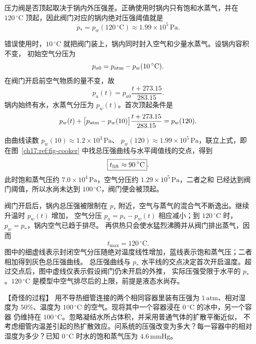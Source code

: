 {\begin{xesolution}
压力阀是否顶起取决于锅内外压强差。正确使用时锅内只有饱和水蒸气，并在 $120\,{}^{\circ}\mathrm C$
顶起，因此阀门对应的锅内绝对压强阈值就是
\[
  p_*=p_w(120\,{}^{\circ}\mathrm C)\approx1.99\times10^5\,\mathrm{Pa}.
\]

错误使用时，$10\,{}^{\circ}\mathrm C$ 就把阀门装上，锅内同时封入空气和少量水蒸气。设锅内容积不变，
初始空气分压为
\[
  p_{a0}=p_{\rm atm}-p_w(10\,{}^{\circ}\mathrm C).
\]
在阀门开启前空气物质的量不变，故
\[
  p_a(t)=p_{a0}\frac{t+273.15}{283.15}.
\]
锅内始终有水，水蒸气分压为 $p_w(t)$。首次顶起条件是
\[
  p_w(t)+\bigl[p_{\rm atm}-p_w(10)\bigr]
  \frac{t+273.15}{283.15}=p_w(120).
\]

\par\noindent\begin{minipage}{\linewidth}
\pressureCookerFigure
{}\label{ch17:ref:fig-cooker}
\end{minipage}\par\medskip

由曲线读数 $p_w(10)\approx1.2\times10^3\,\mathrm{Pa}$、
$p_w(120)\approx1.99\times10^5\,\mathrm{Pa}$，联立上式，即在图~\ref{ch17:ref:fig-cooker} 中找总压强曲线与水平阈值线的交点，得到
\[
  \boxed{t_{\rm lift}\approx90\,{}^{\circ}\mathrm C}.
\]
此时饱和蒸气压约 $7.0\times10^4\,\mathrm{Pa}$，空气分压约 $1.29\times10^5\,\mathrm{Pa}$，二者之和
已经达到阀门阈值，所以水尚未达到 $100\,{}^{\circ}\mathrm C$，阀门便会被顶起。

阀门开启后，锅内总压强被限制在 $p_*$ 附近，空气与蒸气的混合气不断逸出。继续升温时 $p_w(t)$ 增加，
空气分压 $p_a=p_*-p_w(t)$ 相应减小；到 $120\,{}^{\circ}\mathrm C$ 时，$p_w=p_*$，锅内空气已趋于排尽。
再供热只会使水猛烈沸腾并从阀门排出蒸气，因而
\[
  \boxed{t_{\max}=120\,{}^{\circ}\mathrm C}.
\]
图中的细虚线表示封闭空气分压随绝对温度线性增加，蓝线表示饱和蒸气压；二者相加得到灰色总压强曲线。
总压强曲线与 $p_*$ 水平线的交点决定首次开启温度。超过交点后，图中虚线仅表示假设阀门仍未开启的外推，
实际压强受限于水平的 $p_*$。$120\,{}^\circ\mathrm C$ 是模型中空气排尽后的上限，前提是液态水尚存。
\end{xesolution}

\par\medskip
\begin{origexamplebox}{【奇怪的过程】}\label{ch17:ex:s31-22-5}
用不导热细管连接的两个相同容器里装有压强为 $1\,\mathrm{atm}$、相对湿度为 $50\%$、温度为
$100\,{}^{\circ}\mathrm C$ 的空气。现将其中一个容器浸在 $0\,{}^{\circ}\mathrm C$ 的冰中，另一个容器
仍维持在 $100\,{}^{\circ}\mathrm C$。忽略凝结水所占体积，并采用普通气体的扩散平衡近似，
不考虑细管内温差引起的热扩散效应。问系统的压强改变为多大？每一容器中的相对湿度为多少？已知
$0\,{}^{\circ}\mathrm C$ 时水的饱和蒸气压为 $4.6\,\mathrm{mmHg}$。


\end{origexamplebox}}
